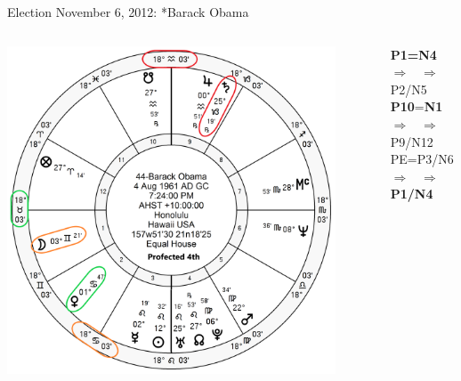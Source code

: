 \begin{frame}[t]{Election November 6, 2012: *Barack Obama}
\begin{columns}[T, onlytextwidth]
\vspace{-1em}
{\includegraphics[width=0.9\textwidth]{charts/Obama-Prof-4th.png}}
\fontsize{8pt}{9pt}\selectfont

\textbf{\dgreen P1=N4}
	$\Rightarrow$ \Venus\, $\Rightarrow$ P2/N5\\
\textbf{\red P10}=\textbf{\dgreen N1}
	$\Rightarrow$ \Saturn\, $\Rightarrow$ P9/N12\\
PE=P3/N6
	 $\Rightarrow$ \Moon\, $\Rightarrow$ \textbf{\dgreen P1/N4}

\end{columns}
\end{frame}

